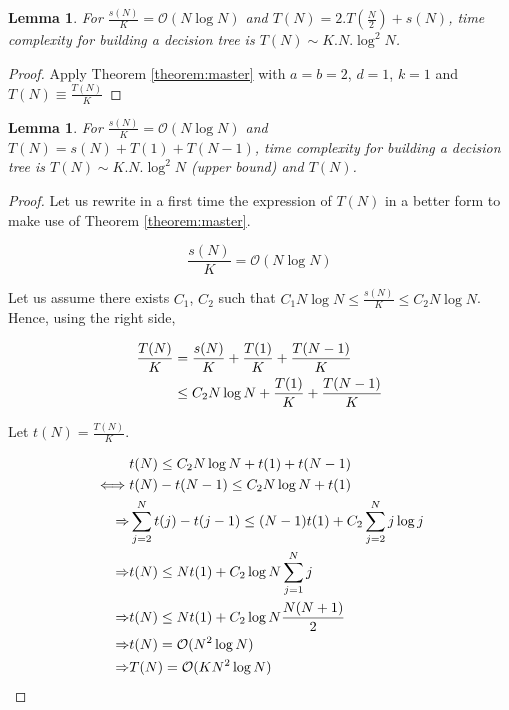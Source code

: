 \documentclass[english,11pt,openany]{article}
\theoremstyle{definition}
\newcommand{\bigO}{\mathcal{O}}
\theoremstyle{plain}
\newtheorem{Lemma}[Th]{Lemma}
\theoremstyle{definition}
\begin{document}
\begin{appendices}
\vspace{0.5cm}
\begin{Lemma}
	For $\frac{s(N)}{K} = \mathcal{O} (N\log N)$ and $T(N) = 2.T(\frac{N}{2}) + s(N)$, 
	time complexity for building a decision tree is $T(N) \sim K.N.\log^2N$.
\end{Lemma}

\begin{proof}
	Apply Theorem \ref{theorem:master} with $a=b=2$, $d=1$, $k=1$ and $T(N) \equiv \frac{T(N)}{K}$
\end{proof}


\begin{Lemma}
	For $\frac{s(N)}{K} = \mathcal{O} (N\log N)$ and $T(N) = s(N) + T(1) + T(N - 1) $, time complexity for building a decision tree is $T(N) \sim K.N.\log^2N$ (upper bound) and $T(N) $.
\end{Lemma}

\begin{proof}
	Let us rewrite in a first time the expression of $T(N)$ in a better form to make use of Theorem \ref{theorem:master}. 
	
	\begin{displaymath}
	\frac{s(N)}{K} = \mathcal{O} (N\log N)
	\end{displaymath}
	
	Let us assume there exists $C_1$, $C_2$ such that $C_1 N\log N \leq \frac{s(N)}{K} \leq C_2 N\log N$. 
	Hence, using the right side, 
	
	\begin{align}
	\frac{T(N)}{K}	& = \frac{s(N)}{K} + \frac{T(1)}{K} + \frac{T(N - 1)}{K} \notag \\
					& \leq C_2 N\log N + \frac{T(1)}{K} + \frac{T(N - 1)}{K}\notag
	\end{align}
	
	Let $t(N) = \frac{T(N)}{K}$. 
	
	\begin{align}
	& t(N) \leq C_2 N\log N + t(1) + t(N-1)\notag \\
	\iff &  t(N) - t(N-1) \leq C_2 N\log N + t(1) \notag\\
	\Rightarrow & \sum_{j=2}^{N}  t(j) - t(j-1) \leq (N-1)t(1) + C_2\sum_{j=2}^{N}j \log j \notag\\
	\Rightarrow & t(N) \leq Nt(1) + C_2\log N \sum_{j=1}^{N}j \notag\\
	\Rightarrow & t(N) \leq Nt(1) + C_2\log N \frac{N(N +1)}{2}\notag \\
	\Rightarrow & t(N) = \bigO (N^2 \log N) \notag \\
	\Rightarrow & T(N) = \bigO (KN^2 \log N) \notag
	\end{align}
	

\end{proof}
\end{appendices}
\end{document}
